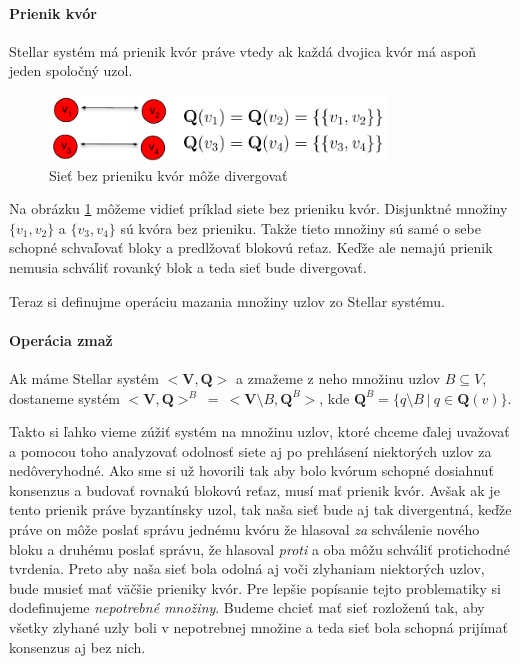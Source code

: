 \paragraph {Prienik kvór} Stellar systém má prienik kvór práve vtedy ak každá
dvojica kvór má aspoň jeden spoločný uzol.

\begin{figure}
\centerline{\includegraphics[width=0.8\textwidth]{images/prienik_kvor.pdf}}
\caption[Príklad siete bez prieniku kvór]{Sieť bez prieniku kvór môže
divergovať} \label{obr:prienik_kvor} \end{figure}

\vspace{4mm}
Na obrázku \ref{obr:prienik_kvor} môžeme vidieť príklad siete bez prieniku kvór.
Disjunktné množiny $\{v_1, v_2\}$ a $\{v_3, v_4\}$ sú kvóra bez prieniku. Takže
tieto množiny sú samé o sebe schopné schvaľovať bloky a predlžovať blokovú
reťaz.
Keďže ale nemajú prienik nemusia schváliť rovanký blok a teda sieť bude
divergovať.

Teraz si definujme operáciu mazania množiny uzlov zo Stellar systému.

\paragraph {Operácia zmaž} Ak máme Stellar systém $<\textbf{V},\textbf{Q}>$ a
zmažeme z neho množinu uzlov $B \subseteq V$, dostaneme systém $<\textbf{V},
\textbf{Q}>^B \: = \: <\textbf{V} \setminus B,\textbf{Q}^B>$, kde $\textbf{Q}^B
= \{q \setminus B \: | \: q \in \textbf{Q}(v)\}$.

\vspace{5mm}
Takto si ľahko vieme zúžiť systém na množinu uzlov, ktoré chceme ďalej uvažovať
a pomocou toho analyzovať odolnosť siete aj po prehlásení niektorých uzlov
za nedôveryhodné. Ako sme si už hovorili tak aby bolo kvórum schopné dosiahnuť
konsenzus a budovať rovnakú blokovú reťaz, musí mať prienik kvór. Avšak ak je
tento prienik práve byzantínsky uzol, tak naša sieť bude aj tak divergentná,
keďže práve on môže poslať správu jednému kvóru že hlasoval \textit{za} schválenie
nového bloku a druhému poslať správu, že hlasoval \textit{proti} a oba môžu schváliť
protichodné tvrdenia. Preto aby naša sieť bola odolná aj voči zlyhaniam niektorých
uzlov, bude musieť mať väčšie prieniky kvór.
Pre lepšie popísanie tejto problematiky si dodefinujeme \textit{nepotrebné množiny}.
Budeme chcieť mať sieť rozloženú tak, aby všetky zlyhané uzly boli v
nepotrebnej množine a teda sieť bola schopná prijímať konsenzus aj bez nich.

